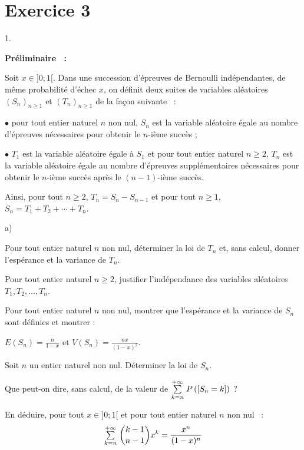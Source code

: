 \documentclass[11pt]{article}%
\begin{document}
\section*{Exercice 3}

\begin{noliste}{1.}
 \setlength{\itemsep}{4mm}
\item \textbf{Préliminaire~ :}

Soit $x\in]0;1[$. Dans une succession d'épreuves de Bernoulli
indépendantes, de même probabilité d'échec $x$, on définit
deux suites de variables aléatoires $(S_{n})_{n\geq 1}$ et
$(T_{n})_{n\geq 1}$
de la façon suivante~ :

$\bullet$ pour tout entier naturel $n$ non nul, $S_{n}$ est la variable
aléatoire égale au nombre d'épreuves nécessaires pour obtenir
le $n$-ième succès ;

$\bullet$ $T_{1}$ est la variable aléatoire égale à $S_{1}$ et
pour tout entier naturel $n\geq 2$, $T_{n}$ est la variable aléatoire
égale au nombre d'épreuves supplémentaires nécessaires pour
obtenir le $n$-ième succès après le $(n-1)$-ième succès.

Ainsi, pour tout $n\geq 2$, $T_{n} = S_{n}-S_{n-1}$ et pour tout $n\geq
1$,
$S_{n} = T_{1} + T_{2} + \cdots + T_{n}$.

\begin{noliste}{a)}
 \setlength{\itemsep}{2mm}
\item Pour tout entier naturel $n$ non nul, déterminer la loi de
$T_{n}$
et, sans calcul, donner l'espérance et la variance de $T_{n}$.

\item Pour tout entier naturel $n\geq 2$, justifier l'indépendance des
variables aléatoires $T_{1},T_{2},\dots,T_{n}$.

\item Pour tout entier naturel $n$ non nul, montrer que l'espérance et
la
variance de $S_{n}$ sont définies et montrer :

$ E(S_{n}) = {\frac{n}{1-x}} \mbox{ et } V(S_{n}) = {\frac
{nx}{(1-x)^{2}}}$.

\item Soit $n$ un entier naturel non nul. Déterminer la loi de $S_{n}$.

Que peut-on dire, sans calcul, de la valeur de ${\textstyle\sum\limits_{k = n}^{+
\infty}}\hspace{.1cm}P\left(\left[ {S_{n} = k} \right]\right)$ ?

\item En déduire, pour tout $x\in]0;1[$ et pour tout entier naturel $n$
non nul~ :
\[
{\textstyle\sum\limits_{k = n}^{+ \infty}}\hspace{.1cm}\binom{k-1}{n-1}x^{k} = {\frac{x^{n}}{(1-x)^{n}}}
\]


\end{noliste}
\end{noliste}
\end{document}
